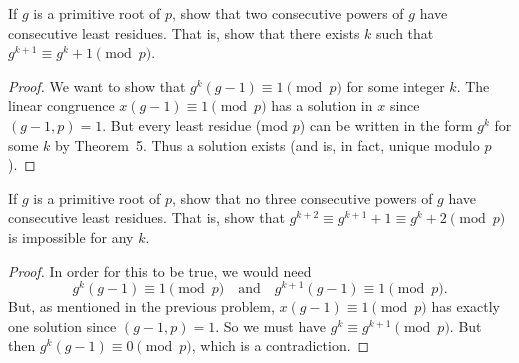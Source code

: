  If $g$ is a primitive root of $p$, show that two
consecutive powers of $g$ have consecutive least residues. That is,
show that there exists $k$ such that $g^{k+1}\equiv g^k+1\pmod{p}$.
\begin{proof}
  We want to show that $g^k(g - 1)\equiv1\pmod{p}$ for some integer
  $k$. The linear congruence $x(g - 1)\equiv1\pmod{p}$ has a solution
  in $x$ since $(g-1,p) = 1$. But every least residue (mod $p$) can be
  written in the form $g^k$ for some $k$ by Theorem~5. Thus a solution
  exists (and is, in fact, unique modulo $p$).
\end{proof}

 If $g$ is a primitive root of $p$, show that no three
consecutive powers of $g$ have consecutive least residues. That is,
show that $g^{k+2}\equiv g^{k+1}+1\equiv g^k+2\pmod{p}$ is impossible
for any $k$.
\begin{proof}
  In order for this to be true, we would need
  \begin{equation*}
    g^k(g - 1)\equiv1\pmod{p}
    \quad\text{and}\quad
    g^{k+1}(g - 1)\equiv1\pmod{p}.
  \end{equation*}
  But, as mentioned in the previous problem, $x(g - 1)\equiv1\pmod{p}$
  has exactly one solution since $(g - 1, p) = 1$. So we must have
  $g^k\equiv g^{k+1}\pmod{p}$. But then $g^k(g - 1)\equiv0\pmod{p}$,
  which is a contradiction.
\end{proof}

